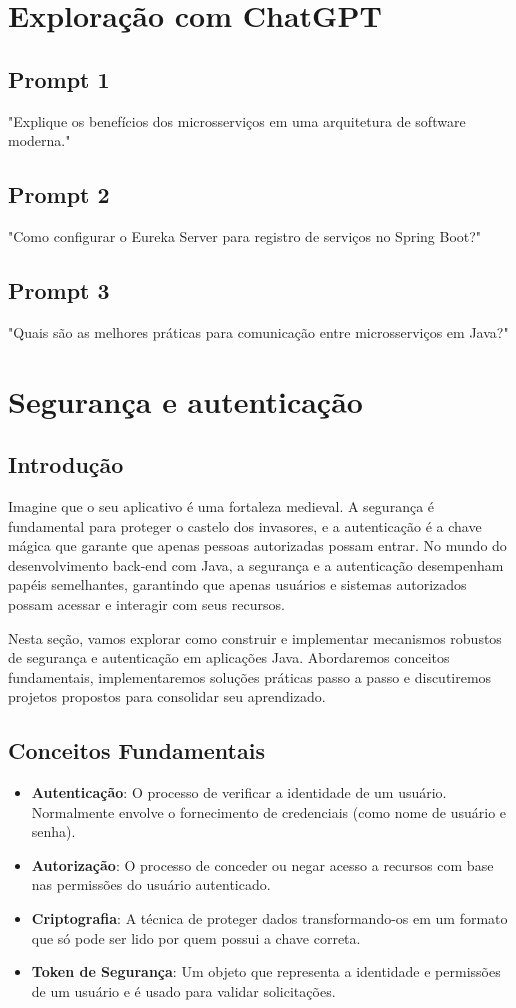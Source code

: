 \documentclass[a4paper,12pt]{book}
\begin{document}
\section{Exploração com ChatGPT}

\subsection{Prompt 1}
"Explique os benefícios dos microsserviços em uma arquitetura de software moderna."

\subsection{Prompt 2}
"Como configurar o Eureka Server para registro de serviços no Spring Boot?"

\subsection{Prompt 3}
"Quais são as melhores práticas para comunicação entre microsserviços em Java?"


\section{Segurança e autenticação}
\subsection{Introdução}
Imagine que o seu aplicativo é uma fortaleza medieval. A segurança é fundamental para proteger o castelo dos invasores, e a autenticação é a chave mágica que garante que apenas pessoas autorizadas possam entrar. No mundo do desenvolvimento back-end com Java, a segurança e a autenticação desempenham papéis semelhantes, garantindo que apenas usuários e sistemas autorizados possam acessar e interagir com seus recursos.

Nesta seção, vamos explorar como construir e implementar mecanismos robustos de segurança e autenticação em aplicações Java. Abordaremos conceitos fundamentais, implementaremos soluções práticas passo a passo e discutiremos projetos propostos para consolidar seu aprendizado.

\subsection{Conceitos Fundamentais}
\begin{itemize}
    \item \textbf{Autenticação}: O processo de verificar a identidade de um usuário. Normalmente envolve o fornecimento de credenciais (como nome de usuário e senha).
    \item \textbf{Autorização}: O processo de conceder ou negar acesso a recursos com base nas permissões do usuário autenticado.
    \item \textbf{Criptografia}: A técnica de proteger dados transformando-os em um formato que só pode ser lido por quem possui a chave correta.
    \item \textbf{Token de Segurança}: Um objeto que representa a identidade e permissões de um usuário e é usado para validar solicitações.
\end{itemize}
\end{document}
